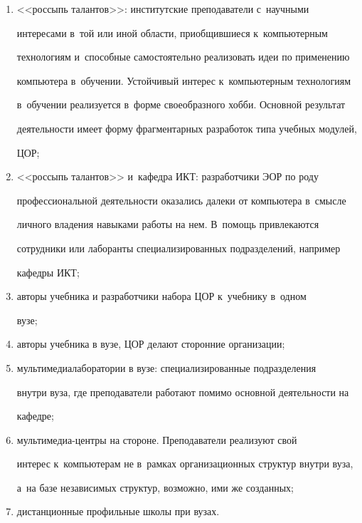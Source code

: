   \begin{enumerate}[(1)]

  \item <<россыпь талантов>>: институтские преподаватели с~научными

интересами в~той или иной области, приобщившиеся к~компьютерным

технологиям и~способные самостоятельно реализовать идеи по применению

компьютера в~обучении. Устойчивый интерес к~компьютерным технологиям

в~обучении реализуется в~форме своеобразного хобби. Основной результат

деятельности имеет форму фрагментарных разработок типа учебных модулей,

ЦОР;

  \item  <<россыпь талантов>> и~кафедра ИКТ: разработчики ЭОР по роду

профессиональной деятельности оказались далеки от компьютера в~смысле

личного владения навыками работы на нем. В~помощь привлекаются

сотрудники или лаборанты специализированных подразделений, например

кафедры ИКТ;

  \item  авторы учебника и разработчики набора ЦОР к~учебнику в~одном

вузе;

  \item  авторы учебника в вузе, ЦОР делают сторонние организации;

  \item  мультимедиалаборатории в вузе: специализированные подразделения

внут\-ри вуза, где преподаватели работают помимо основной деятельности на

кафедре;

  \item  мультимедиа-центры на стороне. Преподаватели реализуют свой

интерес к~компьютерам не в~рамках организационных структур внутри вуза,

а~на базе независимых структур, возможно, ими же созданных;

  \item  дистанционные профильные школы при вузах.

  \end{enumerate}



